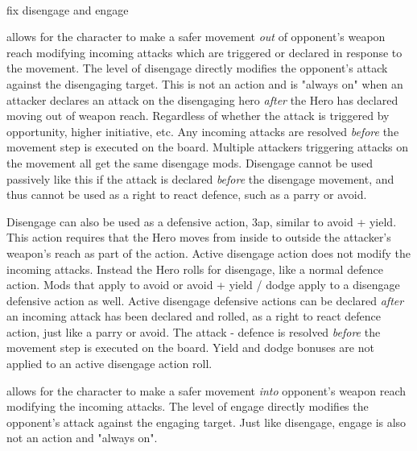 
\

\closeskillslist
\todo fix disengage and engage
\openskillslist


 allows for the character to make a safer movement \emph{out} of opponent's weapon reach modifying incoming attacks which are triggered or declared in response to the movement. The level of disengage directly modifies the opponent's attack against the disengaging target. This is not an action and is "always on" when an attacker declares an attack on the disengaging hero \emph{after} the Hero has declared moving out of weapon reach. Regardless of whether the attack is triggered by opportunity, higher initiative, etc. Any incoming attacks are resolved \emph{before} the movement step is executed on the board. Multiple attackers triggering attacks on the movement all get the same disengage mods.
Disengage cannot be used passively like this if the attack is declared \emph{before} the disengage movement, and thus cannot be used as a right to react defence, such as a parry or avoid.

Disengage can also be used as a defensive action, 3ap, similar to avoid + yield. This action requires that the Hero moves from inside to outside the attacker's weapon's reach as part of the action. Active disengage action does not modify the incoming attacks. Instead the Hero rolls for disengage, like a normal defence action. Mods that apply to avoid or avoid + yield / dodge apply to a disengage defensive action as well.
Active disengage defensive actions can be declared \emph{after} an incoming attack has been declared and rolled, as a right to react defence action, just like a parry or avoid.
The attack - defence is resolved \emph{before} the movement step is executed on the board.
Yield and dodge bonuses are not applied to an active disengage action roll.


 allows for the character to make a safer movement \emph{into} opponent's weapon reach modifying the incoming attacks. The level of engage directly modifies the opponent's attack against the engaging target.
Just like disengage, engage is also not an action and "always on".

